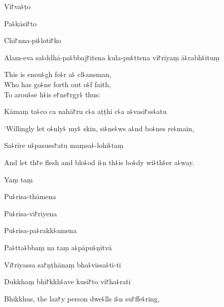 
Vi꜓va꜕ṭo


Pa꜕kāsi꜓to


Chi꜓nna-pi꜕loti꜓ko


Alam-eva sa꜕ddhā-pa꜕bbaj꜓itena kula-pu꜕ttena vī꜓riyaṃ ā꜕rabh꜕ituṃ

\begin{english}
  This is enou꜕gh fo꜕r a꜕ cl꜕ansman,\\
  Who has go꜕ne forth out o꜕f faith,\\
  To arou꜕se h꜕is e꜓ne꜓rgy꜕ thus:
\end{english}

Kāmaṃ ta꜕co ca nahā꜓ru c꜕a aṭṭhi c꜕a a꜕vasi꜓ss꜕atu

\begin{english}
  `Willingly let o꜕nly꜕ my꜕ skin, si꜕ne꜕ws a꜕nd bo꜕nes re꜕main,
\end{english}

Sa꜕rīre u꜕pasuss꜓atu maṃsa꜕-lohi꜕taṃ

\begin{english}
  And let th꜓e flesh and blo꜕od i꜕n th꜕is bo꜕dy wi꜕th꜕er a꜕way.
\end{english}

Yaṃ taṃ


Pu꜕risa-thāmena


Pu꜕risa-vī꜓riyena


Pu꜕risa-pa꜕rakk꜕amena


Pa꜕tta꜕bbaṃ na taṃ a꜕pāpu꜕ṇitvā


Vī꜓riyassa sa꜓ṇṭhānaṃ bha꜕vissa꜕tī-ti


Dukkhaṃ bhi꜓kkh꜕ave kusī꜓to vi꜓ha꜕rati

\begin{english}
  Bhikkhus, the laz꜓y person dwe꜕lls i꜕n su꜓ffe꜕ring,
\end{english}

